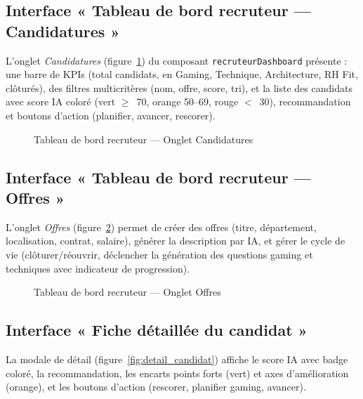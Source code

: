 \subsection{Interface « Tableau de bord recruteur --- Candidatures »}

L'onglet \textit{Candidatures} (figure~\ref{fig:dashboard_recruteur_candidatures}) du composant \texttt{recruteurDashboard} présente : une barre de KPIs (total candidats, en Gaming, Technique, Architecture, RH Fit, clôturés), des filtres multicritères (nom, offre, score, tri), et la liste des candidats avec score IA coloré (vert $\geq$~70, orange 50--69, rouge $<$~30), recommandation et boutons d'action (planifier, avancer, rescorer).

\begin{figure}[hbt!]
  \centering
  \caption{Tableau de bord recruteur --- Onglet Candidatures}
  \label{fig:dashboard_recruteur_candidatures}
\end{figure}
\FloatBarrier

\subsection{Interface « Tableau de bord recruteur --- Offres »}

L'onglet \textit{Offres} (figure~\ref{fig:dashboard_recruteur_offres}) permet de créer des offres (titre, département, localisation, contrat, salaire), générer la description par IA, et gérer le cycle de vie (clôturer/réouvrir, déclencher la génération des questions gaming et techniques avec indicateur de progression).

\begin{figure}[hbt!]
  \centering
  \caption{Tableau de bord recruteur --- Onglet Offres}
  \label{fig:dashboard_recruteur_offres}
\end{figure}
\FloatBarrier

\subsection{Interface « Fiche détaillée du candidat »}

La modale de détail (figure~\ref{fig:detail_candidat}) affiche le score IA avec badge coloré, la recommandation, les encarts points forts (vert) et axes d'amélioration (orange), et les boutons d'action (rescorer, planifier gaming, avancer).

